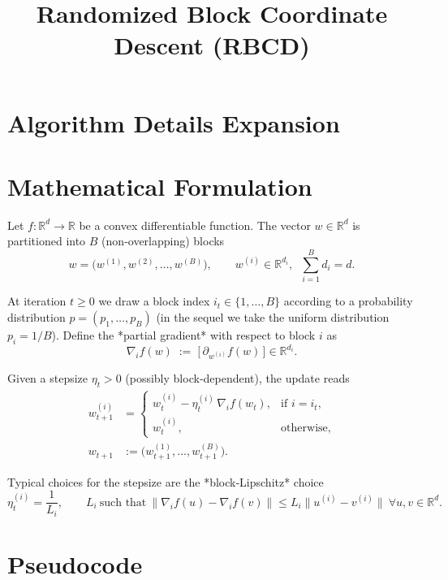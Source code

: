 \documentclass[11pt]{article}
\begin{document}
\title{Randomized Block Coordinate Descent (RBCD)}
\author{}
\date{}
\maketitle

\section*{Algorithm Details Expansion}

\section{Mathematical Formulation}
Let $f:\mathbb{R}^{d}\rightarrow\mathbb{R}$ be a convex differentiable function.
The vector $w\in\mathbb{R}^{d}$ is partitioned into $B$ (non‑overlapping) blocks
\[
w=\bigl(w^{(1)},w^{(2)},\dots ,w^{(B)}\bigr),\qquad 
w^{(i)}\in\mathbb{R}^{d_i},\;\;\sum_{i=1}^{B}d_i=d .
\]

At iteration $t\ge 0$ we draw a block index $i_t\in\{1,\dots ,B\}$ according to a
probability distribution $p=(p_1,\dots ,p_B)$ (in the sequel we take the
uniform distribution $p_i=1/B$).  
Define the *partial gradient* with respect to block $i$ as
\[
\nabla_i f(w) \;:=\; \bigl[\,\partial_{w^{(i)}}f(w)\,\bigr]\in\mathbb{R}^{d_i}.
\]

Given a stepsize $\eta_t>0$ (possibly block‑dependent), the update reads
\[
\boxed{
\begin{aligned}
w_{t+1}^{(i)} &=
\begin{cases}
w_{t}^{(i)}-\eta_t^{(i)}\,\nabla_i f(w_t), & \text{if } i=i_t,\\[4pt]
w_{t}^{(i)}, & \text{otherwise},
\end{cases}\\[4pt]
w_{t+1} &:=\bigl(w_{t+1}^{(1)},\dots ,w_{t+1}^{(B)}\bigr).
\end{aligned}}
\tag{1}
\]

Typical choices for the stepsize are the *block‑Lipschitz* choice
\[
\eta_t^{(i)}=\frac{1}{L_i}, \qquad
L_i\ \text{such that}\ 
\|\nabla_i f(u)-\nabla_i f(v)\| \le L_i\|u^{(i)}-v^{(i)}\|
\ \forall u,v\in\mathbb{R}^d .
\tag{2}
\]

\section{Pseudocode}
\end{document}
